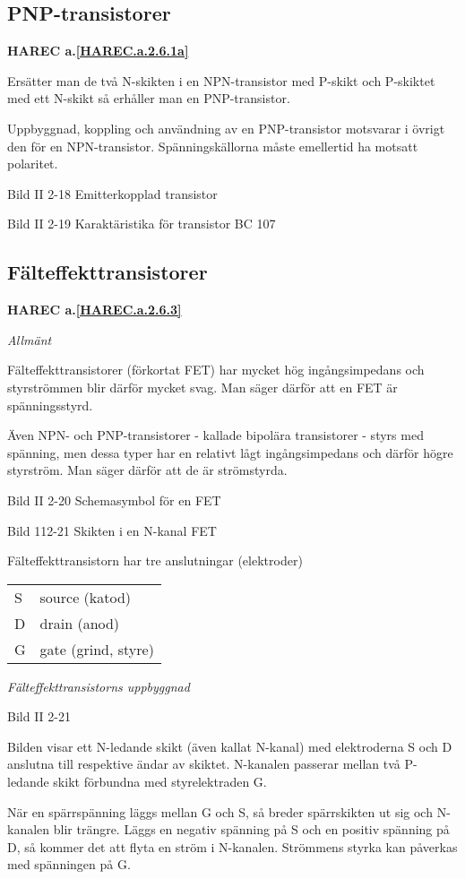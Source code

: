 \subsection{PNP-transistorer}
\textbf{HAREC a.\ref{HAREC.a.2.6.1a}\label{myHAREC.a.2.6.1a}}

Ersätter man de två N-skikten i en NPN-transistor med P-skikt och P-skiktet med
ett N-skikt så erhåller man en PNP-transistor.

Uppbyggnad, koppling och användning av en PNP-transistor motsvarar i övrigt den
för en NPN-transistor. Spänningskällorna måste emellertid ha motsatt polaritet.

Bild II 2-18 Emitterkopplad transistor

Bild II 2-19 Karaktäristika för transistor BC 107

\subsection{Fälteffekttransistorer}
\textbf{HAREC a.\ref{HAREC.a.2.6.3}\label{myHAREC.a.2.6.3}}

\emph{Allmänt}

Fälteffekttransistorer (förkortat FET) har mycket hög ingångsimpedans och
styrströmmen blir därför mycket svag. Man säger därför att en FET är
spänningsstyrd.

Även NPN- och PNP-transistorer - kallade bipolära transistorer - styrs med
spänning, men dessa typer har en relativt lågt ingångsimpedans och därför högre
styrström. Man säger därför att de är strömstyrda.

Bild II 2-20 Schemasymbol för en FET

Bild 112-21 Skikten i en N-kanal FET

Fälteffekttransistorn har tre anslutningar (elektroder)
\begin{tabular}{ll}
  S & source (katod) \\
  D & drain (anod) \\
  G & gate (grind, styre) \\
\end{tabular}

\emph{Fälteffekttransistorns uppbyggnad}

Bild II 2-21

Bilden visar ett N-ledande skikt (även kallat N-kanal) med elektroderna S och D
anslutna till respektive ändar av skiktet. N-kanalen passerar mellan två
P-ledande skikt förbundna med styrelektraden G.

När en spärrspänning läggs mellan G och S, så breder spärrskikten ut sig och
N-kanalen blir trängre. Läggs en negativ spänning på S och en positiv spänning
på D, så kommer det att flyta en ström i N-kanalen. Strömmens styrka kan
påverkas med spänningen på G.

